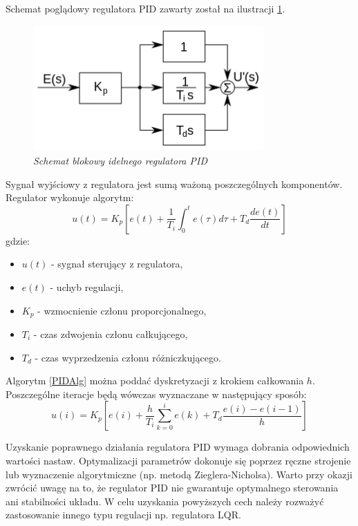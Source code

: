 \documentclass[12pt, twoside, openany]{report}
\theoremstyle{definition}
\begin{document}
Schemat poglądowy regulatora PID zawarty został na ilustracji \ref{PID}.

\begin{figure}[H]
	\centering
		\includegraphics[width = 250pt]{PID} 
		\caption{\textit{Schemat blokowy idelnego regulatora PID \cite{PID}}}
		\label{PID}
\end{figure}

Sygnał wyjściowy z regulatora jest sumą ważoną poszczególnych komponentów. Regulator wykonuje algorytm:
\begin{equation} \label{PIDAlg}
u(t) = K_p[e(t) + \frac{1}{T_i}\int_{0}^{t} e(\tau) d\tau + T_d \frac{de(t)}{dt}]
\end{equation}
gdzie:
\begin{itemize}
\item $u(t)$ - sygnał sterujący z regulatora,
\item $e(t)$ - uchyb regulacji,
\item $K_p$ - wzmocnienie członu proporcjonalnego,
\item $T_i$ - czas zdwojenia członu całkującego,
\item $T_d$ - czas wyprzedzenia członu różniczkującego.
\end{itemize}

Algorytm \ref{PIDAlg} można poddać dyskretyzacji z krokiem całkowania $h$. Poszczególne iteracje będą wówczas wyznaczane w następujący sposób:
\begin{equation}
u(i) = K_p[e(i) + \frac{h}{T_i} \sum_{k=0}^{i} e(k) + T_d \frac{e(i) - e(i-1)}{h}]
\end{equation}

Uzyskanie poprawnego działania regulatora PID wymaga dobrania odpowiednich wartości nastaw. Optymalizacji parametrów dokonuje się poprzez ręczne strojenie lub wyznaczenie algorytmiczne (np. metodą Zieglera-Nicholsa). Warto przy okazji zwrócić uwagę na to, że regulator PID nie gwarantuje optymalnego sterowania ani stabilności układu. W celu uzyskania powyższych cech należy rozważyć zastosowanie innego typu regulacji np. regulatora LQR.
\end{document}
